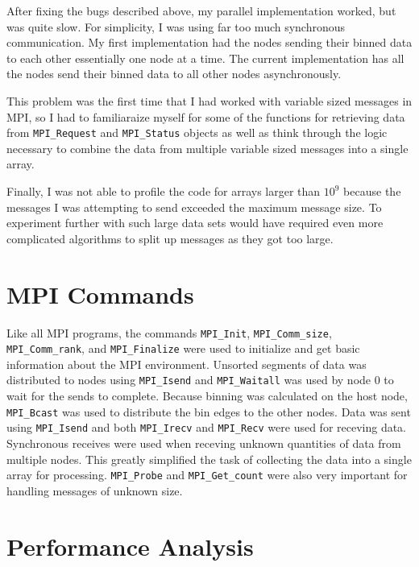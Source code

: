 \documentclass{article}
\begin{document}
After fixing the bugs described above, my parallel implementation worked, but was quite slow. For simplicity, I was using far too much synchronous communication. My first implementation had the nodes sending their binned data to each other essentially one node at a time. The current implementation has all the nodes send their binned data to all other nodes asynchronously.

This problem was the first time that I had worked with variable sized messages in MPI, so I had to familiaraize myself for some of the functions for retrieving data from \verb!MPI_Request! and \verb!MPI_Status! objects as well as think through the logic necessary to combine the data from multiple variable sized messages into a single array. 

Finally, I was not able to profile the code for arrays larger than \(10^9\) because the messages I was attempting to send exceeded the maximum message size. To experiment further with such large data sets would have required even more complicated algorithms to split up messages as they got too large. 

\section{MPI Commands}
Like all MPI programs, the commands \verb!MPI_Init!, \verb!MPI_Comm_size!, \verb!MPI_Comm_rank!, and \verb!MPI_Finalize! were used to initialize and get basic information about the MPI environment. Unsorted segments of data was distributed to nodes using \verb!MPI_Isend! and \verb!MPI_Waitall! was used by node 0 to wait for the sends to complete. Because binning was calculated on the host node, \verb!MPI_Bcast! was used to distribute the bin edges to the other nodes. Data was sent using \verb!MPI_Isend! and both \verb!MPI_Irecv! and \verb!MPI_Recv! were used for receving data. Synchronous receives were used when receving unknown quantities of data from multiple nodes. This greatly simplified the task of collecting the data into a single array for processing. \verb!MPI_Probe! and \verb!MPI_Get_count! were also very important for handling messages of unknown size.

\section{Performance Analysis}
\end{document}
